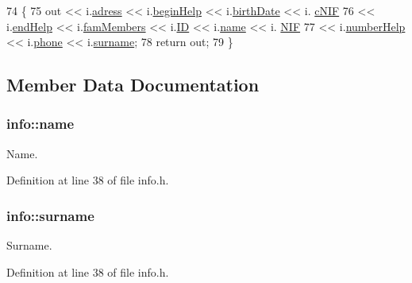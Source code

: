\begin{DoxyCode}
74                                                                \{
75         out << i.\hyperlink{structinfo_a589dff7ad548e9ac9a45f632539c9a0a}{adress} << i.\hyperlink{structinfo_a860bf129937fda542024222bd425a224}{beginHelp} << i.\hyperlink{structinfo_a2269c62bc80419abee5ab99596715014}{birthDate} << i.
      \hyperlink{structinfo_a46ee4d6a7e5976d795ed9efa02341fce}{cNIF}
76             << i.\hyperlink{structinfo_ac9af3f49f3357521492ffaf635897af4}{endHelp} << i.\hyperlink{structinfo_a1b51e61437e4e0b422a49ad00b8a4e65}{famMembers} << i.\hyperlink{structinfo_a3c042f827b9847005666b1ecc5221549}{ID} << i.\hyperlink{structinfo_a27cfacf228447e06d83abd01882eb78d}{name} << i.
      \hyperlink{structinfo_a68e2c3e3e7e8e6df17e1f5b466506319}{NIF}
77             << i.\hyperlink{structinfo_a96e373e7fbb00b84889fba5f87e23c6a}{numberHelp} << i.\hyperlink{structinfo_a716fe5520eb096be308dcd18f7cbd1c1}{phone} << i.\hyperlink{structinfo_a9dd9f00d6b74f1d7b4519e509efd0031}{surname};
78         \textcolor{keywordflow}{return} out;
79     \} 
\end{DoxyCode}


\subsection{Member Data Documentation}
\hypertarget{structinfo_a27cfacf228447e06d83abd01882eb78d}{
\subsubsection[{name}]{\setlength{\rightskip}{0pt plus 5cm}info\+::name}}\label{structinfo_a27cfacf228447e06d83abd01882eb78d}


Name. 



Definition at line 38 of file info.\+h.

\hypertarget{structinfo_a9dd9f00d6b74f1d7b4519e509efd0031}{
\subsubsection[{surname}]{\setlength{\rightskip}{0pt plus 5cm}info\+::surname}}\label{structinfo_a9dd9f00d6b74f1d7b4519e509efd0031}


Surname. 



Definition at line 38 of file info.\+h.

